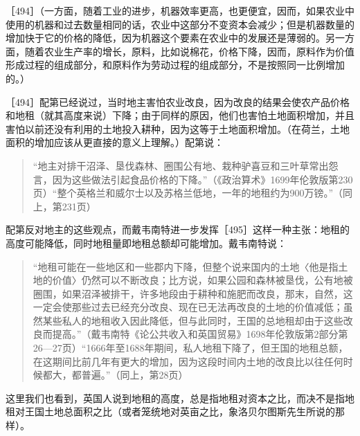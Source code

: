 ［494］（一方面，随着工业的进步，机器效率更高，也更便宜，因而，如果农业中使用的机器和过去数量相同的话，农业中这部分不变资本会减少；但是机器数量的增加快于它的价格的降低，因为机器这个要素在农业中的发展还是薄弱的。另一方面，随着农业生产率的增长，原料，比如说棉花，价格下降，因而，原料作为价值形成过程的组成部分，和原料作为劳动过程的组成部分，不是按照同一比例增加的。）


［494］配第已经说过，当时地主害怕农业改良，因为改良的结果会使农产品价格和地租（就其高度来说）下降；由于同样的原因，他们也害怕土地面积增加，并且害怕以前还没有利用的土地投入耕种，因为这等于土地面积增加。（在荷兰，土地面积的增加应该从更直接的意义上理解。）配第说：

\begin{quote}{“地主对排干沼泽、垦伐森林、圈围公有地、栽种驴喜豆和三叶草常出怨言，因为这些做法引起食品价格的下降。”（《政治算术》1699年伦敦版第230页）“整个英格兰和威尔士以及苏格兰低地，一年的地租约为900万镑。”（同上，第231页）}\end{quote}

配第反对地主的这些观点，而戴韦南特进一步发挥［495］这样一种主张：地租的高度可能降低，同时地租量即地租总额却可能增加。戴韦南特说：

\begin{quote}{“地租可能在一些地区和一些郡内下降，但整个说来国内的土地〈他是指土地的价值〉仍然可以不断改良；比方说，如果公园和森林被垦伐，公有地被圈围，如果沼泽被排干，许多地段由于耕种和施肥而改良，那末，自然，这一定会使那些过去已经充分改良、现在已无法再改良的土地的价值减低；虽然某些私人的地租收入因此降低，但与此同时，王国的总地租却由于这些改良而提高。”（戴韦南特《论公共收入和英国贸易》1698年伦敦版第2部分第26—27页）“1666年至1688年期间，私人地租下降了，但王国的地租总额，在这期间比前几年有更大的增加，因为这段时间内土地的改良比以往任何时候都大，都普遍。”（同上，第28页）}\end{quote}

这里我们也看到，英国人说到地租的高度，总是指地租对资本之比，而决不是指地租对王国土地总面积之比（或者笼统地对英亩之比，象洛贝尔图斯先生所说的那样）。



